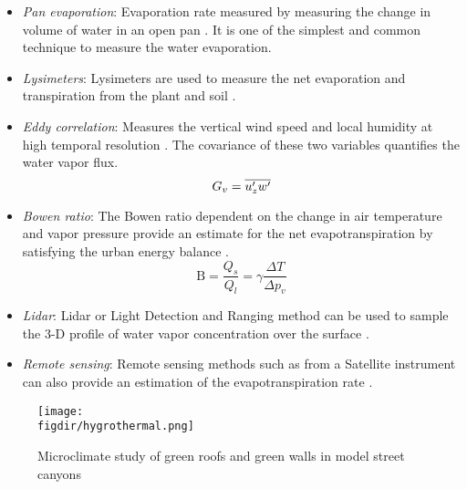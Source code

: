 \begin{itemize}
	\item \textit{Pan evaporation}: Evaporation rate measured by measuring the change in volume of water in an open pan \citep{Finnigan1979, crowell2000guidelines, Farquhar2007, abtew2012evaporation}. It is one of the simplest and common technique to measure the water evaporation. 
	\item \textit{Lysimeters}: Lysimeters are used to measure the net evaporation and transpiration from the plant and soil \citep{Abtew1996,abtew2012evaporation}. 
	\item \textit{Eddy correlation}: Measures the vertical wind speed and local humidity at high temporal resolution \citep{German2000, shuttleworth1993evaporation}. The covariance of these two variables quantifies the water vapor flux.
		\begin{equation}
		G_v = \overline{u_z'w'}
		\end{equation}
	\item \textit{Bowen ratio}: The Bowen ratio dependent on the change in air temperature and vapor pressure provide an estimate for the net evapotranspiration by satisfying the urban energy balance \citep{Chen2006,Thom1975,DosReis1998,abtew2012evaporation,Deardorff1978}.
		\begin{equation}
		\mathrm{B} = \frac{Q_s}{Q_l} = \gamma \frac{\Delta T}{\Delta p_v}  
		\end{equation}
	\item \textit{Lidar}: Lidar or Light Detection and Ranging method can be used to sample the 3-D profile of water vapor concentration over the surface \citep{abtew2012evaporation,Idso1977}. 
	\item \textit{Remote sensing}: Remote sensing methods such as from a Satellite instrument can also provide an estimation of the evapotranspiration rate \citep{Kustas1990,Melesse2008,Melesse2009,abtew2012evaporation}. 
\end{itemize}


\begin{figure}[t]
	\centering
	\texttt{[image: \\figdir/hygrothermal.png]}
	\caption{Microclimate study of green roofs and green walls in model street canyons \citep{Djedjig2015}}
	\label{fig:hygrothermal}
\end{figure}

